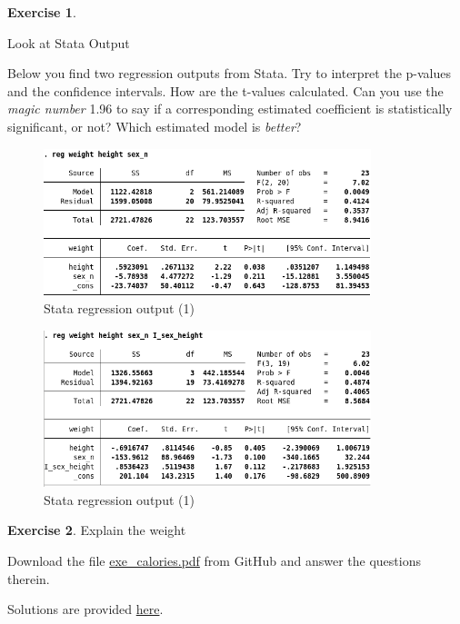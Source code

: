 \documentclass[
  12pt,
  oneside]{book}
\theoremstyle{definition}
\theoremstyle{definition}
\theoremstyle{definition}
\newtheorem{exercise}{Exercise}[chapter]
\theoremstyle{definition}
\theoremstyle{remark}
\begin{document}
\begin{exercise}
\protect\hypertarget{exr:exrstataoutput}{}\label{exr:exrstataoutput}

Look at Stata Output

Below you find two regression outputs from Stata. Try to interpret the p-values and the confidence intervals. How are the t-values calculated. Can you use the \emph{magic number} 1.96 to say if a corresponding estimated coefficient is statistically significant, or not? Which estimated model is \emph{better}?

\begin{figure}
\centering
\includegraphics[width=0.85\textwidth,height=\textheight]{fig/reg_stata_class2.png}
\caption{\label{fig:regstata3} Stata regression output (1)}
\end{figure}

\begin{figure}
\centering
\includegraphics[width=0.85\textwidth,height=\textheight]{fig/reg_stata_class.png}
\caption{\label{fig:regstata3b} Stata regression output (1)}
\end{figure}

\end{exercise}

\begin{exercise}
\protect\hypertarget{exr:explainweight}{}\label{exr:explainweight}Explain the weight

Download the file \href{https://github.com/hubchev/courses/blob/main/pdfs/exe_calories.pdf}{exe\_calories.pdf} from GitHub and answer the questions therein.

Solutions are provided \href{https://raw.githubusercontent.com/hubchev/courses/main/scr/regress_lecture.R}{here}.
\end{exercise}
\end{document}
